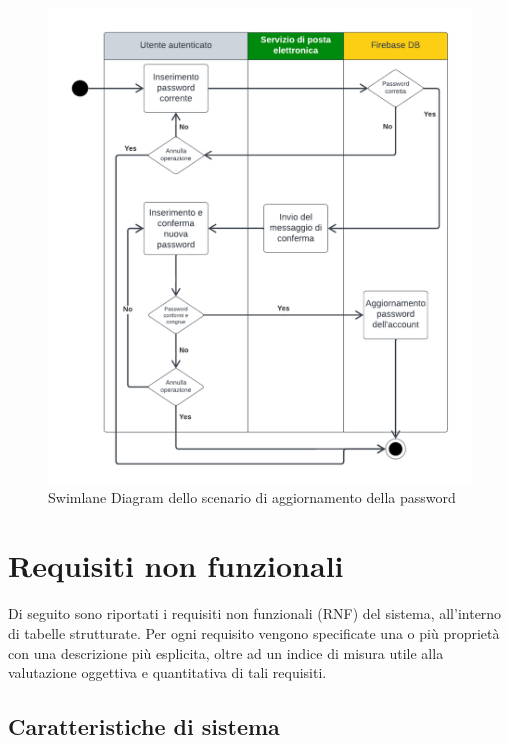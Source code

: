 \documentclass[11pt, a4paper]{article}
\theoremstyle{definition} %
\begin{document}
\begin{figure}[H]
\centering
\includegraphics[scale=0.65]{materiale/ucdiagrams/swimlanepassword.pdf}
\caption{Swimlane Diagram dello scenario di aggiornamento della password}
\label{slpassword}
\end{figure}


\newpage
\section{Requisiti non funzionali}
Di seguito sono riportati i requisiti non funzionali (RNF)
del sistema, all'interno di tabelle strutturate. Per ogni requisito vengono
specificate una o più proprietà con una descrizione più esplicita,
oltre ad un indice di misura utile alla valutazione oggettiva
e quantitativa di tali requisiti.

\subsection{Caratteristiche di sistema}
\end{document}
